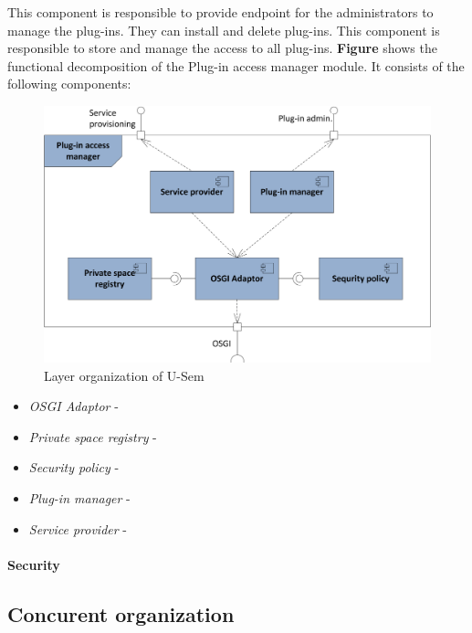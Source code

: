 This component is responsible to provide endpoint for the administrators to manage the plug-ins. They can install and delete plug-ins. This component is responsible to store and manage the access to all plug-ins. \textbf{Figure} shows the functional decomposition of the Plug-in access manager module. It consists of the following components:


\begin{figure}[h!]
  \centering
  	\includegraphics[scale=0.85]{plug-in/layers/access-func.png}
  \caption{Layer organization of U-Sem}
\end{figure}

\begin{itemize}

\item \textit{OSGI Adaptor} - 

\item \textit{Private space registry} - 

\item \textit{Security policy} - 

\item \textit{Plug-in manager} - 

\item \textit{Service provider} - 

\end{itemize}

\paragraph{Security}

\subsection{Concurent organization}

